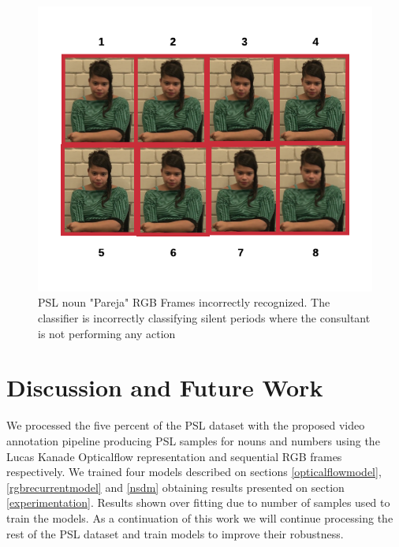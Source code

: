 \documentclass[twocolumn,conference]{article}
\begin{document}
\begin{figure}[hbt!]
\includegraphics[width=\linewidth]{images/pareja-rgb-frame-wrong.png}
\caption{PSL noun "Pareja" RGB Frames incorrectly recognized. The classifier is incorrectly classifying silent periods where the consultant is not performing any action}
\label{fig:rgb-pareja-wrong-sample}
\end{figure}

\section{Discussion and Future Work}\label{discussion-future-work}

We processed the five percent of the PSL dataset with the proposed video annotation pipeline producing PSL samples for nouns and numbers using the Lucas Kanade Opticalflow representation and sequential RGB frames respectively. We trained four models described on sections \ref{opticalflowmodel}, \ref{rgbrecurrentmodel} and \ref{nsdm} obtaining results presented on section \ref{experimentation}. Results shown over fitting due to number of samples used to train the models. As a continuation of this work we will continue processing the rest of the PSL dataset and train models to improve their robustness. 
\end{document}
